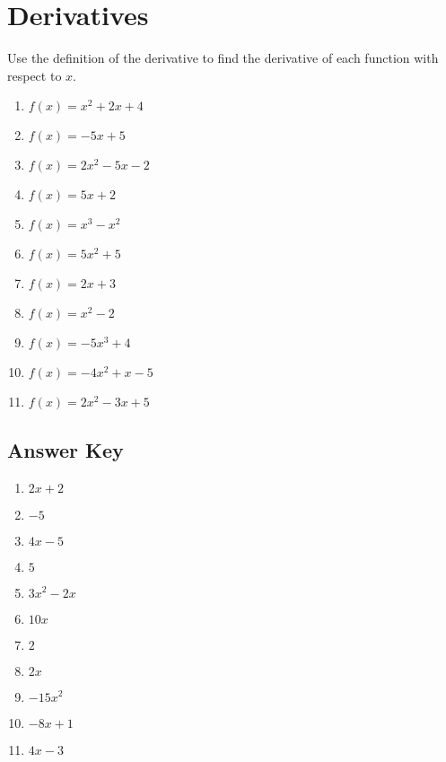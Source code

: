 \chapter{Derivatives}

Use the definition of the derivative to find the derivative of each function with respect to $x$.

\begin{enumerate}
	\item $f(x) = x^2 + 2x + 4$
	\item $f(x) = -5x + 5$
	\item $f(x) = 2x^2 - 5x - 2$
	\item $f(x) = 5x+2$
	\item $f(x) = x^3 - x^2$
	\item $f(x) = 5x^2 + 5$
	\item $f(x) = 2x + 3$
	\item $f(x) = x^2 - 2$
	\item $f(x) = -5x^3 + 4$
	\item $f(x) = -4x^2 + x - 5$
	\item $f(x) = 2x^2 - 3x + 5$
\end{enumerate}

\newpage

\section{Answer Key}

\begin{enumerate}
	\item $2x + 2$
	\item $-5$
	\item $4x - 5$
	\item $5$
	\item $3x^2 - 2x$
	\item $10x$
	\item $2$
	\item $2x$
	\item $-15x^2$
	\item $-8x + 1$
	\item $4x - 3$
\end{enumerate}